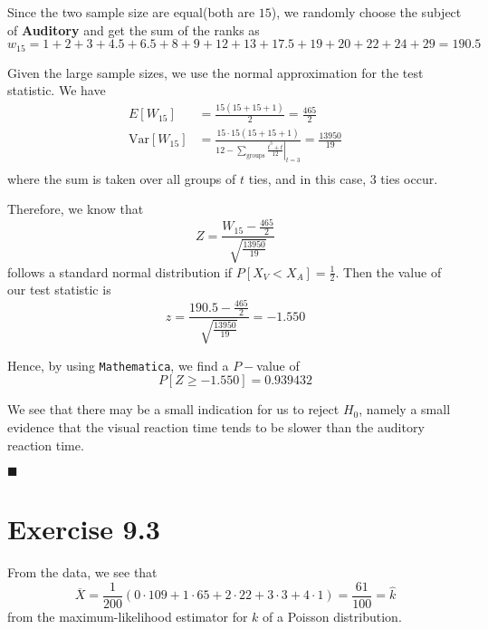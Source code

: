 \documentclass[13pt]{article}
\newcommand{\myqed}{\hfill$\blacksquare$}
\newcommand{\at}[3]{\left.#1\right\vert_{#2}^{#3}}
\begin{document}
\par Since the two sample size are equal(both are $15$), we randomly choose the subject of \textbf{Auditory} and get the 
sum of the ranks as 
\begin{equation*}
    w_{15} = 1+2+3+4.5+6.5+8+9+12+13+17.5+19+20+22+24+29 = 190.5
\end{equation*}

\par Given the large sample sizes, we use the normal approximation for the test statistic. We have 
\begin{equation*}
    \begin{split}
        E[W_{15}] &= \frac{15(15 + 15 + 1)}{2} = \frac{465}{2}\\
        \text{Var}[W_{15}] &= \frac{15\cdot 15(15 + 15 + 1)}{12 - \sum\limits_{\text{groups}}\at{\frac{t^3 + t}{12}}{t = 3}{}} = \frac{13950}{19}\\
    \end{split}
\end{equation*}
where the sum is taken over all groups of $t$ ties, and in this case, $3$ ties occur.

\par Therefore, we know that 
\begin{equation*}
    Z = \frac{W_{15} - \frac{465}{2}}{\sqrt{\frac{13950}{19}}}
\end{equation*}
follows a standard normal distribution if $P[X_V < X_A] = \frac{1}{2}$. Then the value of our test statistic is 
\begin{equation*}
    z = \frac{190.5 - \frac{465}{2}}{\sqrt{\frac{13950}{19}}} = -1.550
\end{equation*}

\par Hence, by using {\tt Mathematica}, we find a $P-$value of 
\begin{equation*}
    P[Z\geq -1.550] = 0.939432
\end{equation*}

\par We see that there may be a small indication for us to reject $H_0$, namely a small evidence that the visual reaction time 
tends to be slower than the auditory reaction time.

\myqed

\newpage
\section*{Exercise 9.3}
\par From the data, we see that 
\begin{equation*}
    \overline{X} = \frac{1}{200}(0\cdot 109 + 1\cdot 65 + 2\cdot 22 + 3\cdot 3 + 4\cdot 1) = \frac{61}{100} = \widehat{k} 
\end{equation*}
from the maximum-likelihood estimator for $k$ of a Poisson distribution.
\end{document}
